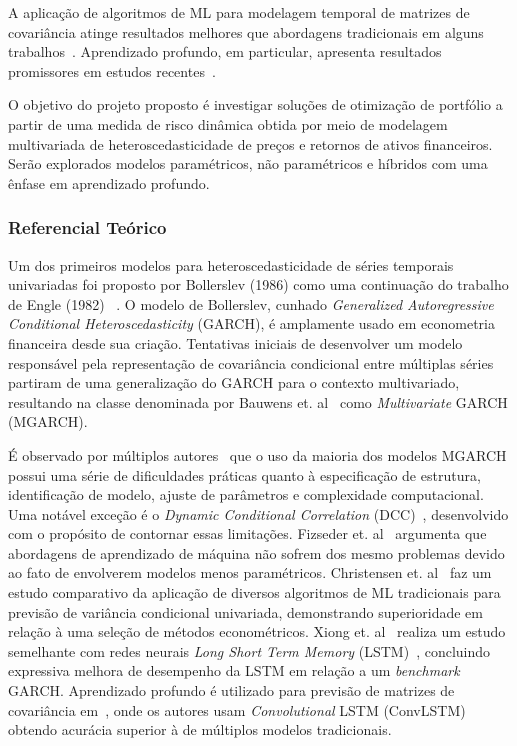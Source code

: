 \documentclass[a4paper, 12pt]{article}
\begin{document}
\begin{spacing}{.9}
A aplicação de algoritmos de ML para modelagem temporal de matrizes de
covariância atinge resultados melhores que abordagens tradicionais em alguns
trabalhos~\cite{svr, ann}. Aprendizado profundo, em particular, apresenta
resultados promissores em estudos recentes~\cite{dl_multi, dl2, fang2021cnn}.

O objetivo do projeto proposto é investigar soluções de otimização de portfólio
a partir de uma medida de risco dinâmica obtida por meio de modelagem
multivariada de heteroscedasticidade de preços e retornos de ativos
financeiros. Serão explorados modelos paramétricos, não paramétricos e híbridos
com uma ênfase em aprendizado profundo.

\subsubsection*{Referencial Teórico}

Um dos primeiros modelos para heteroscedasticidade de séries temporais
univariadas foi proposto por Bollerslev (1986) como uma continuação do trabalho
de Engle (1982) ~\cite{garch}. O modelo de Bollerslev, cunhado
\emph{Generalized Autoregressive Conditional Heteroscedasticity} (GARCH), é
amplamente usado em econometria financeira desde sua criação. Tentativas
iniciais de desenvolver um modelo responsável pela representação de covariância
condicional entre múltiplas séries partiram de uma generalização do GARCH para
o contexto multivariado, resultando na classe denominada por Bauwens et.
al~\cite{bauwens} como \emph{Multivariate} GARCH (MGARCH).

É observado por múltiplos autores~\cite{bauwens, morettin} que o uso da maioria
dos modelos MGARCH possui uma série de dificuldades práticas quanto à
especificação de estrutura, identificação de modelo, ajuste de parâmetros e
complexidade computacional. Uma notável exceção é o \emph{Dynamic Conditional
Correlation} (DCC)~\cite{dcc}, desenvolvido com o propósito de contornar essas
limitações. Fizseder et. al~\cite{svr} argumenta que abordagens de aprendizado
de máquina não sofrem dos mesmo problemas devido ao fato de envolverem modelos
menos paramétricos. Christensen et. al~\cite{christensen} faz um estudo
comparativo da aplicação de diversos algoritmos de ML tradicionais para
previsão de variância condicional univariada, demonstrando superioridade em
relação à uma seleção de métodos econométricos. Xiong et. al~\cite{xiong}
realiza um estudo semelhante com redes neurais \emph{Long Short Term Memory}
(LSTM)~\cite{LSTM}, concluindo expressiva melhora de desempenho da LSTM em relação a um
\emph{benchmark} GARCH. Aprendizado profundo é utilizado para previsão de
matrizes de covariância em~\cite{fang2021cnn}, onde os autores usam
\emph{Convolutional} LSTM (ConvLSTM)~\cite{convlstm} obtendo acurácia superior
à de múltiplos modelos tradicionais.



\end{spacing}
\end{document}
